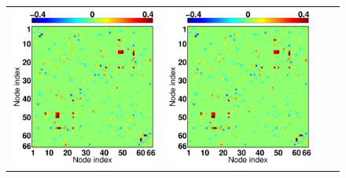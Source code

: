 \begin{figure}[ptbh]
	\centering
	\renewcommand{\imwidth} {0.23\linewidth}
	\setlength{\tabcolsep}{4.25pt} 
	\begin{tabular}{cccc}
		\includegraphics[width=\imwidth]{sim_best_weight_lass100.pdf} &
		\includegraphics[width=\imwidth]{sim_best_weight_enet100.pdf} &

\end{tabular}
\end{figure}
